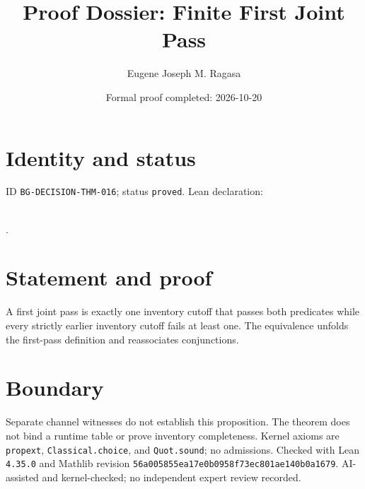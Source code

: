 \documentclass[11pt]{article}
\title{Proof Dossier: Finite First Joint Pass}\author{Eugene Joseph M. Ragasa}\date{Formal proof completed: 2026-10-20}
\begin{document}
\maketitle
\section{Identity and status}
ID \texttt{BG-DECISION-THM-016}; status \texttt{proved}. Lean declaration:
\par{}\\
{\tiny{}}.
\section{Statement and proof}
A first joint pass is exactly one inventory cutoff that passes both predicates while
every strictly earlier inventory cutoff fails at least one. The equivalence unfolds the
first-pass definition and reassociates conjunctions.
\section{Boundary}
Separate channel witnesses do not establish this proposition. The theorem does not bind
a runtime table or prove inventory completeness. Kernel axioms are \texttt{propext},
\texttt{Classical.choice}, and \texttt{Quot.sound}; no admissions. Checked with Lean
\texttt{4.35.0} and Mathlib revision
\texttt{56a005855ea17e0b0958f73ec801ae140b0a1679}. AI-assisted and kernel-checked;
no independent expert review recorded.
\end{document}
